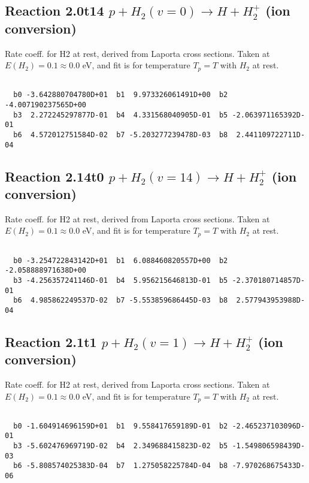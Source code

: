 \documentclass[12pt,dvipdfmx]{article}
\begin{document}
\newpage
\subsection{
Reaction 2.0t14
$ p + H_2(v=0) \rightarrow H + H_2^+$ (ion conversion)
}
Rate coeff. for H2 at rest, derived from Laporta cross sections.
Taken at $E(H_2) = 0.1 \approx 0.0$ eV,  and fit is for temperature $T_p=T$ with $H_2$ at rest.

\begin{small}\begin{verbatim}

  b0 -3.642880704780D+01  b1  9.973326061491D+00  b2 -4.007190237565D+00
  b3  2.272245297877D-01  b4  4.331568040905D-01  b5 -2.063971165392D-01
  b6  4.572012751584D-02  b7 -5.203277239478D-03  b8  2.441109722711D-04

\end{verbatim}\end{small}

\newpage
\subsection{
Reaction 2.14t0
$ p + H_2(v=14) \rightarrow H + H_2^+$ (ion conversion)
}
Rate coeff. for H2 at rest, derived from Laporta cross sections.
Taken at $E(H_2) = 0.1 \approx 0.0$ eV,  and fit is for temperature $T_p=T$ with $H_2$ at rest.

\begin{small}\begin{verbatim}

  b0 -3.254722843142D+01  b1  6.088460820557D+00  b2 -2.058888971638D+00
  b3 -4.256357241146D-01  b4  5.956215646813D-01  b5 -2.370180714857D-01
  b6  4.985862249537D-02  b7 -5.553859686445D-03  b8  2.577943953988D-04

\end{verbatim}\end{small}

\newpage
\subsection{
Reaction 2.1t1
$ p + H_2(v=1) \rightarrow H + H_2^+$ (ion conversion)
}
Rate coeff. for H2 at rest, derived from Laporta cross sections.
Taken at $E(H_2) = 0.1 \approx 0.0$ eV,  and fit is for temperature $T_p=T$ with $H_2$ at rest.

\begin{small}\begin{verbatim}

  b0 -1.604914696159D+01  b1  9.558417659189D-01  b2 -2.465237103096D-01
  b3 -5.602476969719D-02  b4  2.349688415823D-02  b5 -1.549806598439D-03
  b6 -5.808574025383D-04  b7  1.275058225784D-04  b8 -7.970268675433D-06

\end{verbatim}\end{small}
\end{document}
